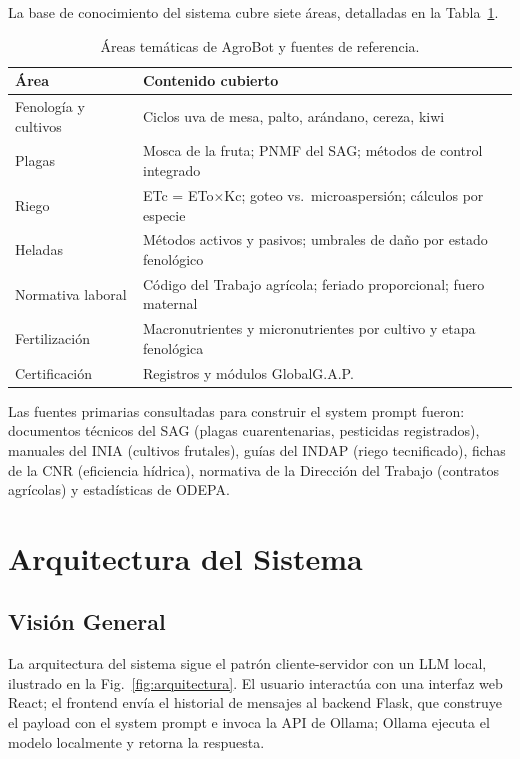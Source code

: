 \documentclass{IEEEtran}
\begin{document}
La base de conocimiento del sistema cubre siete áreas, detalladas en la
Tabla~\ref{tab:areas}.

\begin{table}[H]
\centering
\caption{Áreas temáticas de AgroBot y fuentes de referencia.}
\label{tab:areas}
\begin{tabular}{p{2.8cm} p{4.8cm}}
\toprule
\textbf{Área} & \textbf{Contenido cubierto} \\
\midrule
Fenología y cultivos &
  Ciclos uva de mesa, palto, arándano, cereza, kiwi \\
Plagas &
  Mosca de la fruta; PNMF del SAG; métodos de control integrado \\
Riego &
  ETc = ETo$\times$Kc; goteo vs.\ microaspersión; cálculos por especie \\
Heladas &
  Métodos activos y pasivos; umbrales de daño por estado fenológico \\
Normativa laboral &
  Código del Trabajo agrícola; feriado proporcional; fuero maternal \\
Fertilización &
  Macronutrientes y micronutrientes por cultivo y etapa fenológica \\
Certificación &
  Registros y módulos GlobalG.A.P. \\
\bottomrule
\end{tabular}
\end{table}

Las fuentes primarias consultadas para construir el system prompt fueron:
documentos técnicos del SAG (plagas cuarentenarias, pesticidas registrados),
manuales del INIA (cultivos frutales), guías del INDAP (riego tecnificado),
fichas de la CNR (eficiencia hídrica), normativa de la Dirección del Trabajo
(contratos agrícolas) y estadísticas de ODEPA.

\section{Arquitectura del Sistema}

\subsection{Visión General}

La arquitectura del sistema sigue el patrón cliente-servidor con un LLM local,
ilustrado en la Fig.~\ref{fig:arquitectura}. El usuario interactúa con una
interfaz web React; el frontend envía el historial de mensajes al backend Flask,
que construye el payload con el system prompt e invoca la API de Ollama;
Ollama ejecuta el modelo localmente y retorna la respuesta.
\end{document}
